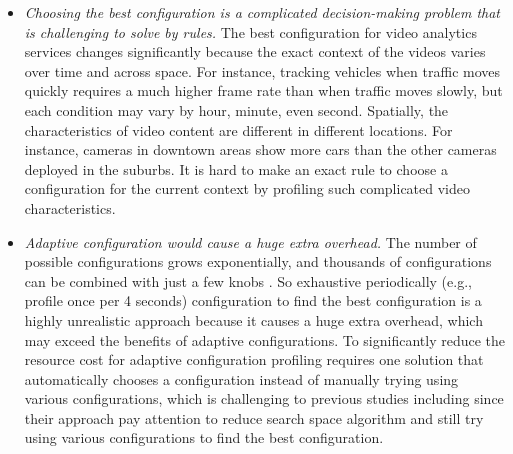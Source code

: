 \begin{itemize}	
	\item \emph{Choosing the best configuration is a complicated decision-making problem that is challenging to solve by rules.} The best configuration for video analytics services changes significantly because the exact context of the videos varies over time and across space. For instance, tracking vehicles when traffic moves quickly requires a much higher frame rate than when traffic moves slowly, but each condition may vary by hour, minute, even second. Spatially, the characteristics of video content are different in different locations. For instance, cameras in downtown areas show more cars than the other cameras deployed in the suburbs. It is hard to make an exact rule to choose a configuration for the current context by profiling such complicated video characteristics.
	
	\item \emph{Adaptive configuration would cause a huge extra overhead.} The number of possible configurations grows exponentially, and thousands of configurations can be combined with just a few knobs \cite{jiang2018chameleon}. So exhaustive periodically (e.g., profile once per 4 seconds) configuration to find the best configuration is a highly unrealistic approach because it causes a huge extra overhead, which may exceed the benefits of adaptive configurations. To significantly reduce the resource cost for adaptive configuration profiling requires one solution that automatically chooses a configuration instead of manually trying using various configurations, which is challenging to previous studies including \cite{wang2020jcab,jiang2018chameleon} since their approach pay attention to reduce search space algorithm and still try using various configurations to find the best configuration. 
	
	
\end{itemize}

